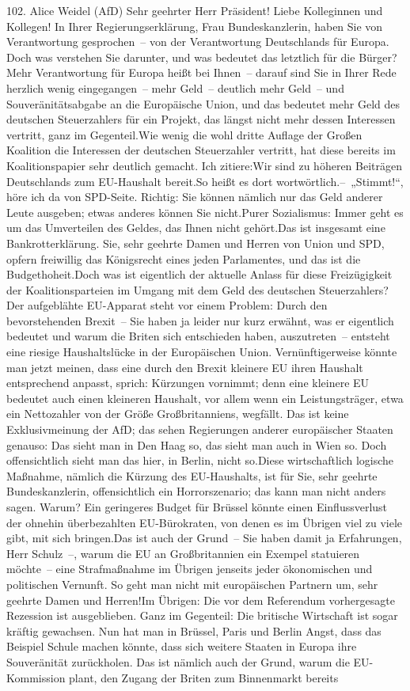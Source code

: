\documentclass{article}
\begin{document}
	102. Alice Weidel (AfD) Sehr geehrter Herr Präsident! Liebe Kolleginnen und Kollegen! In Ihrer Regierungserklärung, Frau Bundeskanzlerin, haben Sie von Verantwortung gesprochen – von der Verantwortung Deutschlands für Europa. Doch was verstehen Sie darunter, und was bedeutet das letztlich für die Bürger? Mehr Verantwortung für Europa heißt bei Ihnen – darauf sind Sie in Ihrer Rede herzlich wenig eingegangen – mehr Geld – deutlich mehr Geld – und Souveränitätsabgabe an die Europäische Union, und das bedeutet mehr Geld des deutschen Steuerzahlers für ein Projekt, das längst nicht mehr dessen Interessen vertritt, ganz im Gegenteil.Wie wenig die wohl dritte Auflage der Großen Koalition die Interessen der deutschen Steuerzahler vertritt, hat diese bereits im Koalitionspapier sehr deutlich gemacht. Ich zitiere:Wir sind zu höheren Beiträgen Deutschlands zum EU-Haushalt bereit.So heißt es dort wortwörtlich.– „Stimmt!“, höre ich da von SPD-Seite. Richtig: Sie können nämlich nur das Geld anderer Leute ausgeben; etwas anderes können Sie nicht.Purer Sozialismus: Immer geht es um das Umverteilen des Geldes, das Ihnen nicht gehört.Das ist insgesamt eine Bankrotterklärung. Sie, sehr geehrte Damen und Herren von Union und SPD, opfern freiwillig das Königsrecht eines jeden Parlamentes, und das ist die Budgethoheit.Doch was ist eigentlich der aktuelle Anlass für diese Freizügigkeit der Koalitionsparteien im Umgang mit dem Geld des deutschen Steuerzahlers? Der aufgeblähte EU-Apparat steht vor einem Problem: Durch den bevorstehenden Brexit – Sie haben ja leider nur kurz erwähnt, was er eigentlich bedeutet und warum die Briten sich entschieden haben, auszutreten – entsteht eine riesige Haushaltslücke in der Europäischen Union. Vernünftigerweise könnte man jetzt meinen, dass eine durch den Brexit kleinere EU ihren Haushalt entsprechend anpasst, sprich: Kürzungen vornimmt; denn eine kleinere EU bedeutet auch einen kleineren Haushalt, vor allem wenn ein Leistungsträger, etwa ein Nettozahler von der Größe Großbritanniens, wegfällt. Das ist keine Exklusivmeinung der AfD; das sehen Regierungen anderer europäischer Staaten genauso: Das sieht man in Den Haag so, das sieht man auch in Wien so. Doch offensichtlich sieht man das hier, in Berlin, nicht so.Diese wirtschaftlich logische Maßnahme, nämlich die Kürzung des EU-Haushalts, ist für Sie, sehr geehrte Bundeskanzlerin, offensichtlich ein Horrorszenario; das kann man nicht anders sagen. Warum? Ein geringeres Budget für Brüssel könnte einen Einflussverlust der ohnehin überbezahlten EU-Bürokraten, von denen es im Übrigen viel zu viele gibt, mit sich bringen.Das ist auch der Grund – Sie haben damit ja Erfahrungen, Herr Schulz –, warum die EU an Großbritannien ein Exempel statuieren möchte – eine Strafmaßnahme im Übrigen jenseits jeder ökonomischen und politischen Vernunft. So geht man nicht mit europäischen Partnern um, sehr geehrte Damen und Herren!Im Übrigen: Die vor dem Referendum vorhergesagte Rezession ist ausgeblieben. Ganz im Gegenteil: Die britische Wirtschaft ist sogar kräftig gewachsen. Nun hat man in Brüssel, Paris und Berlin Angst, dass das Beispiel Schule machen könnte, dass sich weitere Staaten in Europa ihre Souveränität zurückholen. Das ist nämlich auch der Grund, warum die EU-Kommission plant, den Zugang der Briten zum Binnenmarkt bereits 
\end{document}

